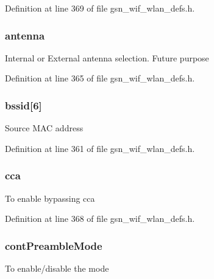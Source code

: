 Definition at line 369 of file gsn\_\-wif\_\-wlan\_\-defs.h.

\hypertarget{a00190_ad84150bc4d20a5e841d834b269db9901}{
\subsubsection[{antenna}]{ {\bf antenna}}}
\label{a00190_ad84150bc4d20a5e841d834b269db9901}
Internal or External antenna selection. Future purpose 

Definition at line 365 of file gsn\_\-wif\_\-wlan\_\-defs.h.

\hypertarget{a00190_af1eb240ad4299a104d0bf3fddcabbb95}{
\subsubsection[{bssid}]{ {\bf bssid}\mbox{[}6\mbox{]}}}
\label{a00190_af1eb240ad4299a104d0bf3fddcabbb95}
Source MAC address 

Definition at line 361 of file gsn\_\-wif\_\-wlan\_\-defs.h.

\hypertarget{a00190_a23fb83ac7301b94474f56a34bb365b83}{
\subsubsection[{cca}]{ {\bf cca}}}
\label{a00190_a23fb83ac7301b94474f56a34bb365b83}
To enable bypassing cca 

Definition at line 368 of file gsn\_\-wif\_\-wlan\_\-defs.h.

\hypertarget{a00190_a0100696bb872bc8447937bc0e7c786bd}{
\subsubsection[{contPreambleMode}]{ {\bf contPreambleMode}}}
\label{a00190_a0100696bb872bc8447937bc0e7c786bd}
To enable/disable the mode 

